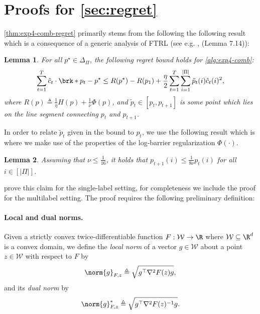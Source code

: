 \documentclass[11pt]{article}
\newcommand{\eqdef}{\triangleq}
\newcommand{\calW}{\mathcal{W}}
\theoremstyle{plain}
\newtheorem{lemma}{Lemma}
\begin{document}
\section[Proofs for Section 4]{Proofs for \cref{sec:regret}}
\label{sec:regret-proofs}

\cref{thm:exp4-comb-regret} primarily stems from the following the following result which is a consequence of a generic analysis of FTRL (see e.g. \cite{hazan2016introduction}, \cite{orabona2019modern} (Lemma 7.14)):

\begin{lemma}
\label{lem:exp4-generic}
    For all $p^\star \in \Delta_\Pi$, the following regret bound holds for \cref{alg:exp4-comb}:
    \begin{align*}
        \sum_{t=1}^T \hat c_t \cdot \brk*{p_t - p^\star} \leq R(p^\star) - R(p_1) + \frac{\eta}{2} \sum_{t=1}^T \sum_{i=1}^{|\Pi|} \tilde p_t(i) \hat c_t(i)^2,
    \end{align*}
    where $R(p) \eqdef \frac{1}{\eta} H(p) + \frac{1}{\nu} \Phi(p)$, and $\tilde p_t \in [p_t, p_{t+1}]$ is some point which lies on the line segment connecting $p_t$ and $p_{t+1}$.
\end{lemma}

In order to relate $\tilde p_t$ given in the bound to $p_t$, we use the following result which is where we make use of the properties of the log-barrier regularization $\Phi(\cdot)$.

\begin{lemma}
\label{lem:log-bar-stability}
    Assuming that $\nu \leq \frac{1}{16}$, it holds that $p_{t+1}(i) \leq \frac{1}{8 \nu} p_t(i)$ for all $i \in [|\Pi|]$.
\end{lemma}

\cite{erez2024real} prove this claim for the single-label setting, for completeness we include the proof for the multilabel setting. The proof requires the following preliminary definition:

\paragraph{Local and dual norms.} Given a strictly convex twice-differentiable function $F : \calW \to \R$ where $\calW \subseteq \R^d$ is a convex domain, we define the \emph{local norm} of a vector $g \in \calW$ about a point $z \in \calW$ with respect to $F$ by 
\begin{align*}
    \norm{g}_{F,z} \eqdef \sqrt{g^\top \nabla^2 F(z) g},
\end{align*}
and its \emph{dual norm} by
\begin{align*}
    \norm{g}^*_{F,z} \eqdef \sqrt{g^\top \nabla^2 F(z)^{-1} g}.
\end{align*}
\end{document}
